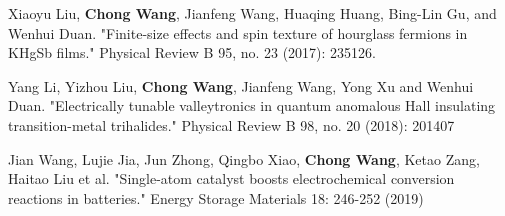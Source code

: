 \begin{resume}
\begin{publications}
    \item Xiaoyu Liu, \textbf{Chong Wang}, Jianfeng Wang, Huaqing Huang, Bing-Lin Gu, and Wenhui Duan. "Finite-size effects and spin texture of hourglass fermions in KHgSb films." Physical Review B 95, no. 23 (2017): 235126.
    
    \item Yang Li, Yizhou Liu, \textbf{Chong Wang}, Jianfeng Wang, Yong Xu and Wenhui Duan. "Electrically tunable valleytronics in quantum anomalous Hall insulating transition-metal trihalides." Physical Review B 98, no. 20 (2018): 201407
    
    \item Jian Wang, Lujie Jia, Jun Zhong, Qingbo Xiao, \textbf{Chong Wang}, Ketao Zang, Haitao Liu et al. "Single-atom catalyst boosts electrochemical conversion reactions in batteries." Energy Storage Materials 18: 246-252 (2019)
  \end{publications}
\end{resume}

